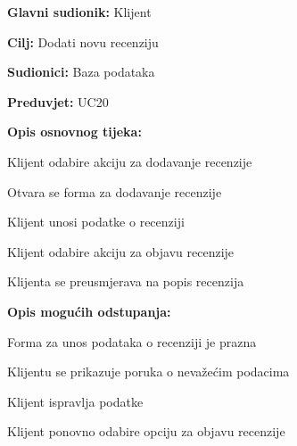 \noindent {}
\begin{packed_item}
	
	\item \textbf{Glavni sudionik:} Klijent
	\item  \textbf{Cilj:} Dodati novu recenziju
	\item  \textbf{Sudionici:} Baza podataka
	\item  \textbf{Preduvjet:} UC20
	\item  \textbf{Opis osnovnog tijeka:}
	
	\item[] \begin{packed_enum}
		
        \item Klijent odabire akciju za dodavanje recenzije
        \item Otvara se forma za dodavanje recenzije
        \item Klijent unosi podatke o recenziji
        \item Klijent odabire akciju za objavu recenzije
        \item Klijenta se preusmjerava na popis recenzija
	
	\end{packed_enum}
	\item  \textbf{Opis mogućih odstupanja:}
	
	\item[] \begin{packed_item}
		
		\item[4.a] Forma za unos podataka o recenziji je prazna
		\item[] \begin{packed_enum}
			
			\item Klijentu se prikazuje poruka o nevažećim podacima
			\item Klijent ispravlja podatke
			\item Klijent ponovno odabire opciju za objavu recenzije
			
		\end{packed_enum}
		
	\end{packed_item}
\end{packed_item}


